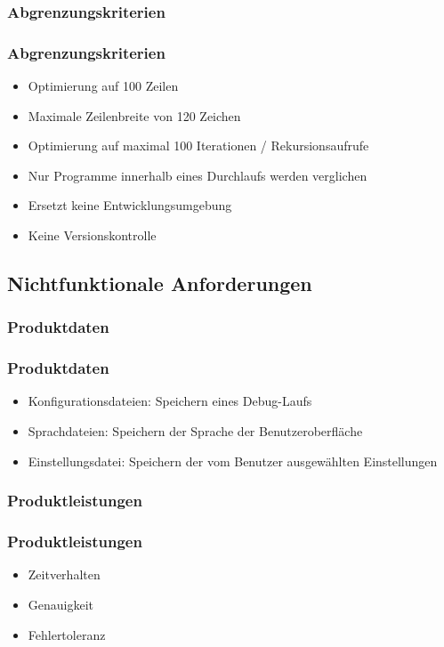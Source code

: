 \documentclass{beamer}
\begin{document}
\subsubsection{Abgrenzungskriterien}
\begin{frame}
\frametitle{Abgrenzungskriterien}
\begin{itemize}
\item Optimierung auf 100 Zeilen
\item Maximale Zeilenbreite von 120 Zeichen
\item Optimierung auf maximal 100 Iterationen / Rekursionsaufrufe
\item Nur Programme innerhalb eines Durchlaufs werden verglichen
\item Ersetzt keine Entwicklungsumgebung
\item Keine Versionskontrolle
\end{itemize}
\end{frame}


\subsection{Nichtfunktionale Anforderungen}
\subsubsection{Produktdaten}
\begin{frame}
\frametitle{Produktdaten}
\begin{itemize}
\item Konfigurationsdateien: Speichern eines Debug-Laufs
\item Sprachdateien: Speichern der Sprache der Benutzeroberfläche
\item Einstellungsdatei: Speichern der vom Benutzer ausgewählten Einstellungen
\end{itemize}
\end{frame}
\subsubsection{Produktleistungen}
\begin{frame}
\frametitle{Produktleistungen}
\begin{itemize}
\item Zeitverhalten
\item Genauigkeit
\item Fehlertoleranz
\end{itemize}
\end{frame}
\end{document}
